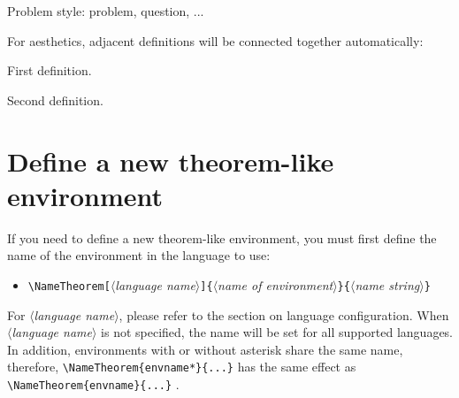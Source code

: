 \documentclass[allowbf,puretext]{beaulivre}
\theoremstyle{basic}
\theoremstyle{emphasis}
\theoremstyle{simple}
\providecommand{\meta}[1]{$\langle${\normalfont\itshape#1}$\rangle$}
\begin{document}
\begin{problem}
    Problem style: problem, question, ...
\end{problem}

\medskip
For aesthetics, adjacent definitions will be connected together automatically:
\begin{definition}
    First definition.
\end{definition}

\begin{definition}
    Second definition.
\end{definition}


\bigskip
\section{Define a new theorem-like environment}

If you need to define a new theorem-like environment, you must first define the name of the environment in the language to use:
\begin{itemize}
    \item \lstinline|\NameTheorem[|\meta{language name}\lstinline|]{|\meta{name of environment}\lstinline|}{|\meta{name string}\lstinline|}|
\end{itemize}
For \meta{language name}, please refer to the section on language configuration. When \meta{language name} is not specified, the name will be set for all supported languages. In addition, environments with or without asterisk share the same name, therefore, \lstinline|\NameTheorem{envname*}{...}| has the same effect as \lstinline|\NameTheorem{envname}{...}| .
\end{document}

